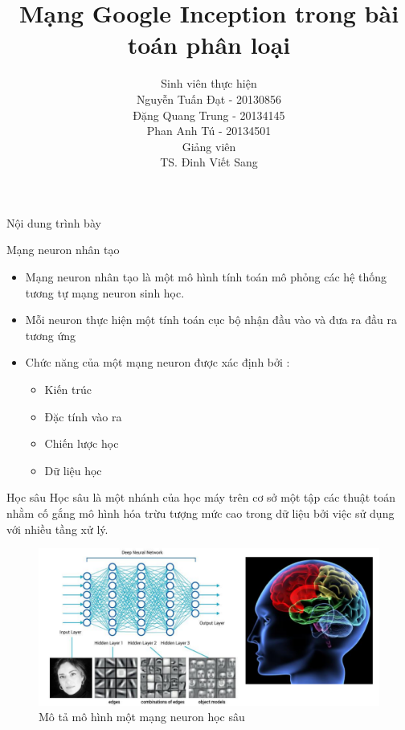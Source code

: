 \documentclass[compress]{beamer}
\title[Mạng Google Inception]{Mạng Google Inception trong bài toán phân loại}
\author[Nguyễn Tuấn Đạt, Đặng Quang Trung, Phan Anh Tú]{
Sinh viên thực hiện\\
Nguyễn Tuấn Đạt - 20130856\\
Đặng Quang Trung - 20134145\\
Phan Anh Tú - 20134501 \\[0.4cm]
Giảng viên \\
TS. Đinh Viết Sang 
}
\begin{document}
 
\begin{frame}
\titlepage
\end{frame} 
  
\begin{frame}{Nội dung trình bày}
\tableofcontents
\end{frame}
\begin{frame}{Mạng neuron nhân tạo}
\begin{itemize}
\item Mạng neuron nhân tạo là một mô hình tính toán mô phỏng các hệ thống tương tự mạng neuron sinh học.
\item Mỗi neuron thực hiện một tính toán cục bộ nhận đầu vào và đưa ra đầu ra tương ứng
\item  Chức năng của một  mạng neuron được xác định bởi :
\begin{itemize}
\item Kiến trúc
\item Đặc tính vào ra
\item Chiến lược học
\item Dữ liệu học 
\end{itemize}
\end{itemize}
\end{frame}
\begin{frame}{Học sâu}
Học sâu là một nhánh của học máy trên cơ sở một tập các thuật toán nhằm cố gắng mô hình hóa trừu tượng mức cao trong dữ liệu bởi việc sử dụng với nhiều tầng xử lý. \\
\begin{figure}[H]
\includegraphics[scale=0.3]{deeplearning.png}
\caption{Mô tả mô hình một mạng neuron học sâu}
\end{figure}
\end{frame}
\end{document}
